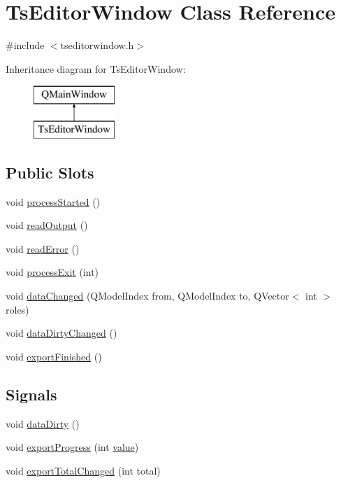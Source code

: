 \hypertarget{class_ts_editor_window}{}\section{Ts\+Editor\+Window Class Reference}
\label{class_ts_editor_window}


{\ttfamily \#include $<$tseditorwindow.\+h$>$}

Inheritance diagram for Ts\+Editor\+Window\+:\begin{figure}[H]
\begin{center}
\leavevmode
\includegraphics[height=2.000000cm]{df/da2/class_ts_editor_window}
\end{center}
\end{figure}
\subsection*{Public Slots}
\begin{DoxyCompactItemize}
\item 
void \mbox{\hyperlink{class_ts_editor_window_aca771ce4def506034a497394ecc4a7fb}{process\+Started}} ()
\item 
void \mbox{\hyperlink{class_ts_editor_window_ac74844d6fbcdba1b2529592e887e270e}{read\+Output}} ()
\item 
void \mbox{\hyperlink{class_ts_editor_window_af1ee710d8865816c85c579e2f333bea6}{read\+Error}} ()
\item 
void \mbox{\hyperlink{class_ts_editor_window_a11fd49d1df7528c22275d3ebb12263a2}{process\+Exit}} (int)
\item 
void \mbox{\hyperlink{class_ts_editor_window_a4db9a8f5f2270164a7a09d32f5e5c57a}{data\+Changed}} (Q\+Model\+Index from, Q\+Model\+Index to, Q\+Vector$<$ int $>$ roles)
\item 
void \mbox{\hyperlink{class_ts_editor_window_a2c872935bb1e6bff36864c30c8a65c51}{data\+Dirty\+Changed}} ()
\item 
void \mbox{\hyperlink{class_ts_editor_window_aa6abcb99d305b39c133e8c9f5ea234b9}{export\+Finished}} ()
\end{DoxyCompactItemize}
\subsection*{Signals}
\begin{DoxyCompactItemize}
\item 
void \mbox{\hyperlink{class_ts_editor_window_ab85ba04c332ce9fe3290c0615f8938cd}{data\+Dirty}} ()
\item 
void \mbox{\hyperlink{class_ts_editor_window_ae29aedee9581674ae0011c8dae1a6609}{export\+Progress}} (int \mbox{\hyperlink{diffusion_8cpp_a4b41795815d9f3d03abfc739e666d5da}{value}})
\item 
void \mbox{\hyperlink{class_ts_editor_window_afc4b7b3001dd21c727a77e61f24e4f30}{export\+Total\+Changed}} (int total)
\end{DoxyCompactItemize}

